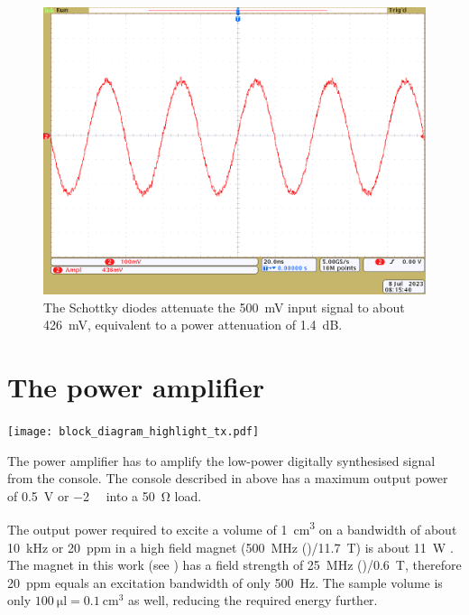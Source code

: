\begin{figure}[hbt]
    \centering
    \includegraphics{images/protection_diode_input_500mVpp_working.png}
    \caption{ The Schottky diodes attenuate the \qty{500}{\milli\volt} input signal to about \qty{426}{\milli\volt}, equivalent to a power attenuation of \qty{1.4}{\deci\bel}.}
\end{figure}

\section{The power amplifier}
\begin{marginfigure}
    \texttt{[image: block\_diagram\_highlight\_tx.pdf]}
\end{marginfigure}

The power amplifier has to amplify the low-power digitally synthesised signal from the console. The console described in  above has a maximum output power of \qty{0.5}{\volt} or \qty{-2}{\deci\belm} into a \qty{50}{\ohm} load.

The output power required to excite a volume of \qty{1}{\centi\meter\cubed} on a bandwidth of about \qty{10}{\kilo\hertz} or \qty{20}{ppm} in a high field magnet (\qty{500}{\mega\hertz} ()/\qty{11.7}{\tesla}) is about \qty{11}{\watt} . The magnet in this work (see ) has a field strength of \qty{25}{\mega\hertz} ()/\qty{0.6}{\tesla}, therefore \qty{20}{ppm} equals an excitation bandwidth of only \qty{500}{\hertz}. The sample volume is only \(\qty{100}{\micro\litre} = \qty{0.1}{\centi\meter\cubed}\) as well, reducing the required energy further.

